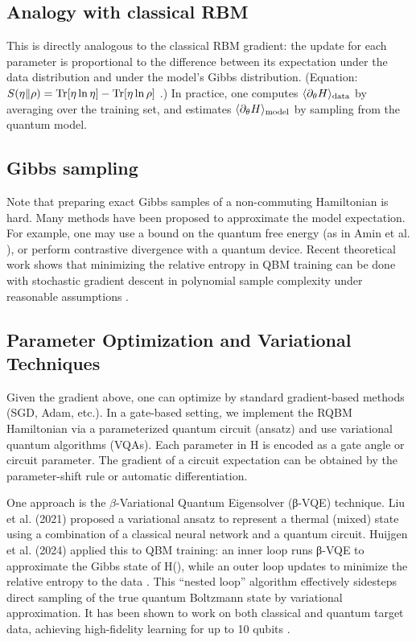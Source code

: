 \documentclass[%
oneside,                 %
final,                   %
10pt]{article}
\begin{document}
\subsection*{Analogy with classical RBM}
This is directly analogous to the classical RBM gradient: the update
for each parameter is proportional to the difference between its
expectation under the data distribution and under the model’s Gibbs
distribution.  (Equation: $S(\eta\Vert\rho)={\rm Tr}[\eta\ln\eta]-{\rm
Tr}[\eta\ln\rho]$ .)  In practice, one computes $\langle
\partial_\theta H\rangle_{\rm data}$ by averaging over the training
set, and estimates $\langle \partial_\theta H\rangle_{\rm model}$ by
sampling from the quantum model.

\subsection*{Gibbs sampling}

Note that preparing exact Gibbs samples of a non-commuting Hamiltonian
is hard.  Many methods have been proposed to approximate the model
expectation.  For example, one may use a bound on the quantum free
energy (as in Amin et al. ), or perform contrastive divergence with a
quantum device.  Recent theoretical work shows that minimizing the
relative entropy in QBM training can be done with stochastic gradient
descent in polynomial sample complexity under reasonable assumptions .

\subsection*{Parameter Optimization and Variational Techniques}

Given the gradient above, one can optimize \theta by standard
gradient-based methods (SGD, Adam, etc.).  In a gate-based setting, we
implement the RQBM Hamiltonian via a parameterized quantum circuit
(ansatz) and use variational quantum algorithms (VQAs).  Each
parameter in H is encoded as a gate angle or circuit parameter.  The
gradient of a circuit expectation can be obtained by the
parameter-shift rule or automatic differentiation.

One approach is the $\beta$-Variational Quantum Eigensolver (β-VQE)
technique.  Liu et al. (2021) proposed a variational ansatz to
represent a thermal (mixed) state using a combination of a classical
neural network and a quantum circuit.  Huijgen et al. (2024) applied
this to QBM training: an inner loop runs β-VQE to approximate the
Gibbs state of H(\theta), while an outer loop updates \theta to
minimize the relative entropy to the data .  This “nested loop”
algorithm effectively sidesteps direct sampling of the true quantum
Boltzmann state by variational approximation.  It has been shown to
work on both classical and quantum target data, achieving
high-fidelity learning for up to 10 qubits .
\end{document}
